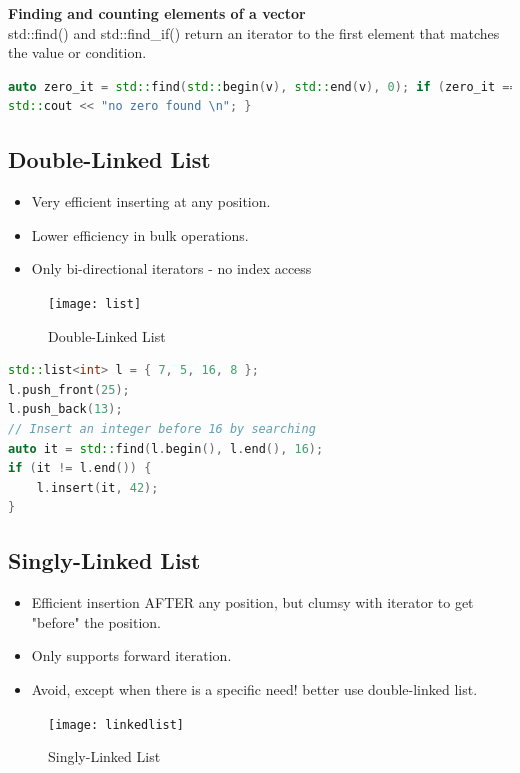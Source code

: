 \textbf{Finding and counting elements of a vector} \\
 std::find() and std::find\_if() return an iterator to the first element that matches the value or condition.
\begin{lstlisting}[language=C++]
auto zero_it = std::find(std::begin(v), std::end(v), 0); if (zero_it == std::end(v)) {
std::cout << "no zero found \n"; }
\end{lstlisting}

\subsection{Double-Linked List}
\begin{itemize}
  \itemsep -0.5em 
  \item Very efficient inserting at any position.
  \item Lower efficiency in bulk operations.
  \item Only bi-directional iterators - no index access
\end{itemize}

\begin{figure}[h!]
  \centering
  \texttt{[image: list]}
  \caption{Double-Linked List}
\end{figure}

\begin{lstlisting}[language=C++]
std::list<int> l = { 7, 5, 16, 8 };
l.push_front(25);
l.push_back(13);
// Insert an integer before 16 by searching
auto it = std::find(l.begin(), l.end(), 16);
if (it != l.end()) {
	l.insert(it, 42);
}
\end{lstlisting}

\subsection{Singly-Linked List}
\begin{itemize}
	\itemsep -0.5em 
	\item Efficient insertion AFTER any position, but clumsy with iterator to get "before" the position.
	\item Only supports forward iteration.
	\item Avoid, except when there is a specific need! better use double-linked list.
\end{itemize}

\begin{figure}[h!]
  \centering
  \texttt{[image: linkedlist]}
  \caption{Singly-Linked List}
\end{figure}

